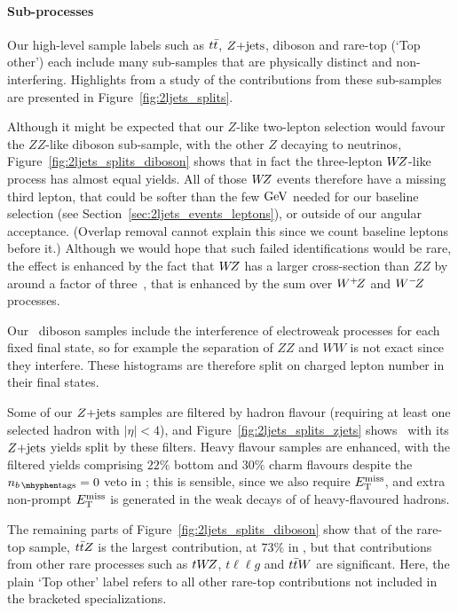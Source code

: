\paragraph{Sub-processes}
Our high-level sample labels such as $\ttbar$, $\zjets$, diboson and
rare-top (`Top other') each include many sub-samples that are physically
distinct and non-interfering.
Highlights from a study of the contributions from these sub-samples are
presented in Figure~\ref{fig:2ljets_splits}.

Although it might be expected that our $Z$-like two-lepton selection would
favour the $ZZ$-like diboson sub-sample, with the other $Z$ decaying to
neutrinos,
Figure~\ref{fig:2ljets_splits_diboson} shows that in fact the three-lepton
$W\kern-0.4exZ$-like process has almost equal yields.
All of those $W\kern-0.4exZ$ events therefore have a missing third lepton, that could be
softer than the few $\eV[G]$ needed for our baseline selection
(see Section~\ref{sec:2ljets_events_leptons}),
or outside of our angular acceptance.
(Overlap removal cannot explain this since we count baseline leptons before
it.)
Although we would hope that such failed identifications would be rare,
the effect is enhanced by the fact that $W\kern-0.4exZ$ has a larger cross-section than
$ZZ$ by around a factor of three~\cite{Campbell:2011bn}, that is enhanced
by the sum over $W^+\kern-0.4exZ$ and $W^-\kern-0.4exZ$ processes.

Our \sherpa\ diboson samples include the interference of electroweak processes
for each fixed final state, so for example the separation of $ZZ$ and $WW$ is
not exact since they interfere.
These histograms are therefore split on charged lepton number in their
final states.

Some of our $\zjets$ samples are filtered by hadron flavour
(requiring at least one selected hadron with $|\eta| < 4$), and
Figure~\ref{fig:2ljets_splits_zjets} shows \crz\ with its $\zjets$ yields
split by these filters.
Heavy flavour samples are enhanced, with the filtered yields comprising
$22\%$ bottom and $30\%$ charm flavours despite the $\nbtag = 0$ veto in \crz;
this is sensible, since we also require $\met$, and extra non-prompt $\met$ is
generated  in the weak decays of of heavy-flavoured hadrons.

The remaining parts of Figure~\ref{fig:2ljets_splits_diboson} show that
of the rare-top sample, $\ttbar Z$ is the largest contribution,
at $73\%$ in \srllbb, but that contributions from other rare processes
such as $tW\kern-0.4exZ$, $t\ell\ell g$ and $\ttbar W$ are significant.
Here, the plain `Top other' label refers to all other rare-top contributions
not included in the bracketed specializations.


